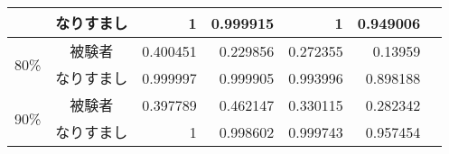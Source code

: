 \begin{center}
\begin{longtable}[btph]{|c|c|r|r|r|r|r|}
           & なりすまし & 1 & 0.999915 & 1 & 0.949006 & \\ \hline
      \multirow{2}{*}{80\%} & 被験者 & 0.400451  & 0.229856  & 0.272355  & 0.13959   & \\ \cline{2-7}
           & なりすまし & 0.999997 & 0.999905 & 0.993996 & 0.898188 & \\ \hline
      \multirow{2}{*}{90\%} & 被験者 & 0.397789  & 0.462147  & 0.330115  & 0.282342  & \\ \cline{2-7}
           & なりすまし & 1 & 0.998602 & 0.999743 & 0.957454 & \\ \hline \hline
  \end{longtable}
\end{center}

